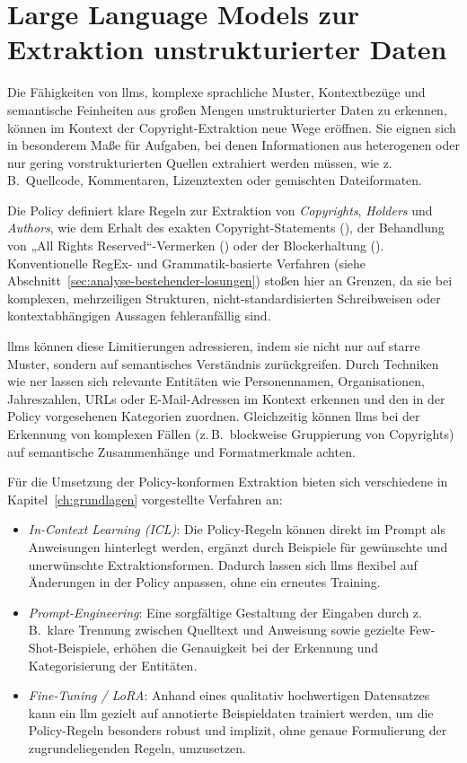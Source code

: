 \section{Large Language Models zur Extraktion unstrukturierter Daten}\label{sec:vorstellung-llm}

Die Fähigkeiten von \glspl{llm}, komplexe sprachliche Muster, Kontextbezüge und semantische Feinheiten aus großen Mengen unstrukturierter Daten zu erkennen, können im Kontext der Copyright-Extraktion neue Wege eröffnen.
Sie eignen sich in besonderem Maße für Aufgaben, bei denen Informationen aus heterogenen oder nur gering vorstrukturierten Quellen extrahiert werden müssen, wie z. B.\ Quellcode, Kommentaren, Lizenztexten oder gemischten Dateiformaten.

Die Policy definiert klare Regeln zur Extraktion von \textit{Copyrights}, \textit{Holders} und \textit{Authors}, wie dem Erhalt des exakten Copyright-Statements (), der Behandlung von „All Rights Reserved“-Vermerken () oder der Blockerhaltung ().
Konventionelle RegEx- und Grammatik-basierte Verfahren (siehe Abschnitt~\ref{sec:analyse-bestehender-losungen}) stoßen hier an Grenzen, da sie bei komplexen, mehrzeiligen Strukturen, nicht-standardisierten Schreibweisen oder kontextabhängigen Aussagen fehleranfällig sind.

\glspl{llm} können diese Limitierungen adressieren, indem sie nicht nur auf starre Muster, sondern auf semantisches Verständnis zurückgreifen.
Durch Techniken wie \gls{ner} lassen sich relevante Entitäten wie Personennamen, Organisationen, Jahreszahlen, URLs oder E-Mail-Adressen im Kontext erkennen und den in der Policy vorgesehenen Kategorien zuordnen.
Gleichzeitig können \glspl{llm} bei der Erkennung von komplexen Fällen (z.\,B.\ blockweise Gruppierung von Copyrights) auf semantische Zusammenhänge und Formatmerkmale achten.

Für die Umsetzung der Policy-konformen Extraktion bieten sich verschiedene in Kapitel~\ref{ch:grundlagen} vorgestellte Verfahren an:
\begin{itemize}
    \item \textit{In-Context Learning (ICL)}: Die Policy-Regeln können direkt im Prompt als Anweisungen hinterlegt werden, ergänzt durch Beispiele für gewünschte und unerwünschte Extraktionsformen. Dadurch lassen sich \glspl{llm} flexibel auf Änderungen in der Policy anpassen, ohne ein erneutes Training.
    \item \textit{Prompt-Engineering}: Eine sorgfältige Gestaltung der Eingaben durch z. B.\ klare Trennung zwischen Quelltext und Anweisung sowie gezielte Few-Shot-Beispiele, erhöhen die Genauigkeit bei der Erkennung und Kategorisierung der Entitäten.
    \item \textit{Fine-Tuning / LoRA}: Anhand eines qualitativ hochwertigen Datensatzes kann ein \gls{llm} gezielt auf annotierte Beispieldaten trainiert werden, um die Policy-Regeln besonders robust und implizit, ohne genaue Formulierung der zugrundeliegenden Regeln, umzusetzen.
\end{itemize}

